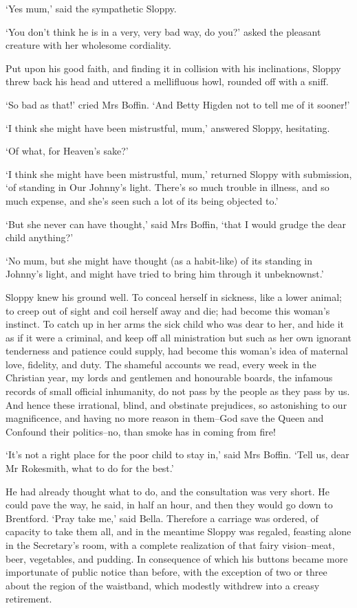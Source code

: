 ‘Yes mum,’ said the sympathetic Sloppy.

‘You don’t think he is in a very, very bad way, do you?’ asked the
pleasant creature with her wholesome cordiality.

Put upon his good faith, and finding it in collision with his
inclinations, Sloppy threw back his head and uttered a mellifluous howl,
rounded off with a sniff.

‘So bad as that!’ cried Mrs Boffin. ‘And Betty Higden not to tell me of
it sooner!’

‘I think she might have been mistrustful, mum,’ answered Sloppy,
hesitating.

‘Of what, for Heaven’s sake?’

‘I think she might have been mistrustful, mum,’ returned Sloppy with
submission, ‘of standing in Our Johnny’s light. There’s so much trouble
in illness, and so much expense, and she’s seen such a lot of its being
objected to.’

‘But she never can have thought,’ said Mrs Boffin, ‘that I would grudge
the dear child anything?’

‘No mum, but she might have thought (as a habit-like) of its standing
in Johnny’s light, and might have tried to bring him through it
unbeknownst.’

Sloppy knew his ground well. To conceal herself in sickness, like a
lower animal; to creep out of sight and coil herself away and die; had
become this woman’s instinct. To catch up in her arms the sick child who
was dear to her, and hide it as if it were a criminal, and keep off all
ministration but such as her own ignorant tenderness and patience could
supply, had become this woman’s idea of maternal love, fidelity, and
duty. The shameful accounts we read, every week in the Christian year,
my lords and gentlemen and honourable boards, the infamous records of
small official inhumanity, do not pass by the people as they pass by
us. And hence these irrational, blind, and obstinate prejudices, so
astonishing to our magnificence, and having no more reason in them--God
save the Queen and Confound their politics--no, than smoke has in coming
from fire!

‘It’s not a right place for the poor child to stay in,’ said Mrs Boffin.
‘Tell us, dear Mr Rokesmith, what to do for the best.’

He had already thought what to do, and the consultation was very short.
He could pave the way, he said, in half an hour, and then they would go
down to Brentford. ‘Pray take me,’ said Bella. Therefore a carriage was
ordered, of capacity to take them all, and in the meantime Sloppy
was regaled, feasting alone in the Secretary’s room, with a complete
realization of that fairy vision--meat, beer, vegetables, and pudding.
In consequence of which his buttons became more importunate of public
notice than before, with the exception of two or three about the region
of the waistband, which modestly withdrew into a creasy retirement.

